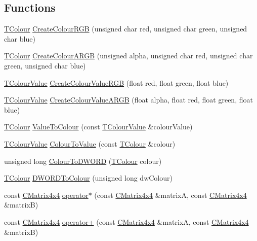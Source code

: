 \subsection*{Functions}
\begin{DoxyCompactItemize}
\item 
\hyperlink{struct_slim_1_1_t_colour}{T\+Colour} \hyperlink{namespace_slim_aa24ab919437d71782c999fbe3ae00684}{Create\+Colour\+R\+G\+B} (unsigned char red, unsigned char green, unsigned char blue)
\item 
\hyperlink{struct_slim_1_1_t_colour}{T\+Colour} \hyperlink{namespace_slim_a4552a8c8d1608fa263493832f8436056}{Create\+Colour\+A\+R\+G\+B} (unsigned alpha, unsigned char red, unsigned char green, unsigned char blue)
\item 
\hyperlink{struct_slim_1_1_t_colour_value}{T\+Colour\+Value} \hyperlink{namespace_slim_a5d1ac4f7c972e4cbff1739d033eda05b}{Create\+Colour\+Value\+R\+G\+B} (float red, float green, float blue)
\item 
\hyperlink{struct_slim_1_1_t_colour_value}{T\+Colour\+Value} \hyperlink{namespace_slim_a3f946ac23c99db95101b23a45a71e020}{Create\+Colour\+Value\+A\+R\+G\+B} (float alpha, float red, float green, float blue)
\item 
\hyperlink{struct_slim_1_1_t_colour}{T\+Colour} \hyperlink{namespace_slim_ab9f8b25407c8c6003e07aa655466b775}{Value\+To\+Colour} (const \hyperlink{struct_slim_1_1_t_colour_value}{T\+Colour\+Value} \&colour\+Value)
\item 
\hyperlink{struct_slim_1_1_t_colour_value}{T\+Colour\+Value} \hyperlink{namespace_slim_a16f668107a1fc8f26253dd2ee92ec7cd}{Colour\+To\+Value} (const \hyperlink{struct_slim_1_1_t_colour}{T\+Colour} \&colour)
\item 
unsigned long \hyperlink{namespace_slim_a243d0325034f663d49e085dcc0e58571}{Colour\+To\+D\+W\+O\+R\+D} (\hyperlink{struct_slim_1_1_t_colour}{T\+Colour} colour)
\item 
\hyperlink{struct_slim_1_1_t_colour}{T\+Colour} \hyperlink{namespace_slim_a7292f1e5fbdd585b9dfd38cf8809d7ad}{D\+W\+O\+R\+D\+To\+Colour} (unsigned long dw\+Colour)
\item 
const \hyperlink{class_slim_1_1_c_matrix4x4}{C\+Matrix4x4} \hyperlink{namespace_slim_a04ad19b4b64c4b9ec0a773e84ccf3a47}{operator$\ast$} (const \hyperlink{class_slim_1_1_c_matrix4x4}{C\+Matrix4x4} \&matrix\+A, const \hyperlink{class_slim_1_1_c_matrix4x4}{C\+Matrix4x4} \&matrix\+B)
\item 
const \hyperlink{class_slim_1_1_c_matrix4x4}{C\+Matrix4x4} \hyperlink{namespace_slim_ace20a9ff098a4977d4345d694938fd97}{operator+} (const \hyperlink{class_slim_1_1_c_matrix4x4}{C\+Matrix4x4} \&matrix\+A, const \hyperlink{class_slim_1_1_c_matrix4x4}{C\+Matrix4x4} \&matrix\+B)

\end{DoxyCompactItemize}
